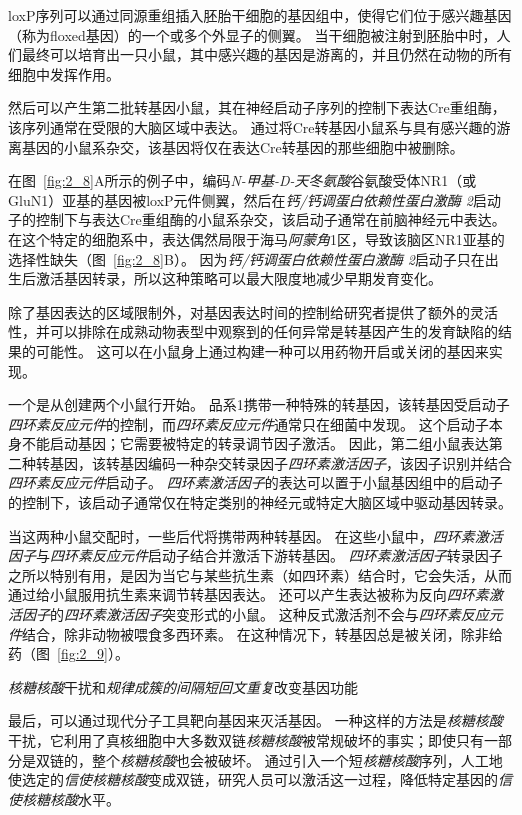\begin{proposition}[在实验动物中产生突变]
	\quad \quad loxP序列可以通过同源重组插入胚胎干细胞的基因组中，使得它们位于感兴趣基因（称为floxed基因）的一个或多个外显子的侧翼。
	当干细胞被注射到胚胎中时，人们最终可以培育出一只小鼠，其中感兴趣的基因是游离的，并且仍然在动物的所有细胞中发挥作用。
	
	\quad \quad 然后可以产生第二批转基因小鼠，其在神经启动子序列的控制下表达Cre重组酶，该序列通常在受限的大脑区域中表达。
	通过将Cre转基因小鼠系与具有感兴趣的游离基因的小鼠系杂交，该基因将仅在表达Cre转基因的那些细胞中被删除。
	
	\quad \quad 在图~\ref{fig:2_8}A所示的例子中，编码\textit{N-甲基-D-天冬氨酸}谷氨酸受体NR1（或GluN1）亚基的基因被loxP元件侧翼，然后在\textit{钙/钙调蛋白依赖性蛋白激酶 2}启动子的控制下与表达Cre重组酶的小鼠系杂交，该启动子通常在前脑神经元中表达。
	在这个特定的细胞系中，表达偶然局限于海马\textit{阿蒙角}1区，导致该脑区NR1亚基的选择性缺失（图~\ref{fig:2_8}B）。
	因为\textit{钙/钙调蛋白依赖性蛋白激酶 2}启动子只在出生后激活基因转录，所以这种策略可以最大限度地减少早期发育变化。
	
	\quad \quad 除了基因表达的区域限制外，对基因表达时间的控制给研究者提供了额外的灵活性，并可以排除在成熟动物表型中观察到的任何异常是转基因产生的发育缺陷的结果的可能性。
	这可以在小鼠身上通过构建一种可以用药物开启或关闭的基因来实现。
	
	\quad \quad 一个是从创建两个小鼠行开始。
	品系1携带一种特殊的转基因，该转基因受启动子\textit{四环素反应元件}的控制，而\textit{四环素反应元件}通常只在细菌中发现。
	这个启动子本身不能启动基因；它需要被特定的转录调节因子激活。
	因此，第二组小鼠表达第二种转基因，该转基因编码一种杂交转录因子\textit{四环素激活因子}，该因子识别并结合\textit{四环素反应元件}启动子。
	\textit{四环素激活因子}的表达可以置于小鼠基因组中的启动子的控制下，该启动子通常仅在特定类别的神经元或特定大脑区域中驱动基因转录。
	
	\quad \quad 当这两种小鼠交配时，一些后代将携带两种转基因。
	在这些小鼠中，\textit{四环素激活因子}与\textit{四环素反应元件}启动子结合并激活下游转基因。
	\textit{四环素激活因子}转录因子之所以特别有用，是因为当它与某些抗生素（如四环素）结合时，它会失活，从而通过给小鼠服用抗生素来调节转基因表达。
	还可以产生表达被称为反向\textit{四环素激活因子}的\textit{四环素激活因子}突变形式的小鼠。
	这种反式激活剂不会与\textit{四环素反应元件}结合，除非动物被喂食多西环素。
	在这种情况下，转基因总是被关闭，除非给药（图~\ref{fig:2_9}）。
	
	\quad \quad \textit{核糖核酸}干扰和\textit{规律成簇的间隔短回文重复}改变基因功能
	
	\quad \quad 最后，可以通过现代分子工具靶向基因来灭活基因。
	一种这样的方法是\textit{核糖核酸}干扰，它利用了真核细胞中大多数双链\textit{核糖核酸}被常规破坏的事实；即使只有一部分是双链的，整个\textit{核糖核酸}也会被破坏。
	通过引入一个短\textit{核糖核酸}序列，人工地使选定的\textit{信使核糖核酸}变成双链，研究人员可以激活这一过程，降低特定基因的\textit{信使核糖核酸}水平。
	
\end{proposition}


